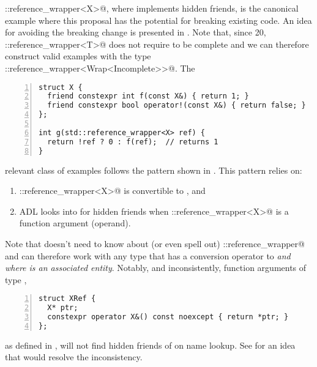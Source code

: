 \codelst@std::reference_wrapper<X>@, where \codelst@X@ implements hidden friends, is the 
canonical example where this proposal has the potential for breaking existing code.
An idea for avoiding the breaking change is presented in . Note that, 
since \CC{}20, \codelst@std::reference_wrapper<T>@ does not require \codelst@T@ to be 
complete and we can therefore construct valid examples with the type 
\codelst@std::reference_wrapper<Wrap<Incomplete>>@. The
\begin{lstlisting}[numbers=left,float={hbtp},label=lst:transparent_reference_wrapper,caption={
Hidden friends are transparent for \code{std::reference_wrapper}
}]
struct X {
  friend constexpr int f(const X&) { return 1; }
  friend constexpr bool operator!(const X&) { return false; }
};

int g(std::reference_wrapper<X> ref) {
  return !ref ? 0 : f(ref);  // returns 1
}
\end{lstlisting}
relevant class of examples follows the pattern shown in 
. This pattern relies on:
\begin{enumerate}
\item \codelst@std::reference_wrapper<X>@ is convertible to \codelst@X@, and
\item ADL looks into \codelst@X@ for hidden friends when 
\codelst@std::reference_wrapper<X>@ is a function argument (operand).
\end{enumerate}
Note that \codelst@X@ doesn't need to know about (or even spell out) 
\codelst@std::reference_wrapper@ and can therefore work with any type that has a 
conversion operator to \codelst@X@ \emph{and where \codelst@X@ is an associated entity}. 
Notably, and inconsistently, function arguments of type \codelst@XRef@,
\begin{lstlisting}[numbers=left,float={hbtp},label=lst:intransparent_reference_wrapper,caption={
Hidden friends are not transparent for a non-template reference wrapper
}]
struct XRef {
  X* ptr;
  constexpr operator X&() const noexcept { return *ptr; }
};
\end{lstlisting}
as defined in , will not find hidden friends of 
\codelst@X@ on name lookup. See  for an idea that would resolve the 
inconsistency.

